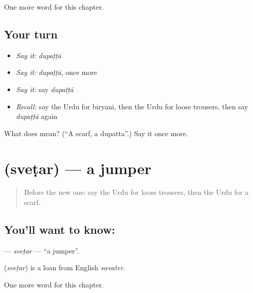 \begin{grammarlens}[title={What you've built}]
One more word for this chapter.
\end{grammarlens}

\subsection*{Your turn}
\begin{itemize}
\raggedright
  \item \emph{Say it:} \emph{dupaṭṭā}
  \item \emph{Say it:} \emph{dupaṭṭā}, once more
  \item \emph{Say it:} say \emph{dupaṭṭā}
  \item \emph{Recall:} say the Urdu for biryani, then the Urdu for loose trousers, then say \emph{dupaṭṭā} again
\end{itemize}

\begin{tcolorbox}[breakable,colback=teal!4,colframe=teal!35!black,title={Before you move on}]
What does  mean? (\textquotedblleft{}A scarf, a dupatta\textquotedblright{}.) Say it once more.
\end{tcolorbox}
\section[\texorpdfstring{\ur{سویٹر} (sveṭar)}{سویٹر (sveṭar)}]{ (sveṭar) — a jumper}

\label{lesson:UR-C121-svetar}



\begin{quote}
Before the new one: say the Urdu for loose trousers, then the Urdu for a scarf.
\end{quote}

\subsection*{You'll want to know: }
\textbf{} — \emph{sveṭar} — \textquotedblleft{}a jumper\textquotedblright{}.

\begin{cousinweb}
\textbf{} (\emph{sveṭar}) is a loan from English \emph{sweater}.
\end{cousinweb}

\begin{grammarlens}[title={What you've built}]
One more word for this chapter.
\end{grammarlens}

